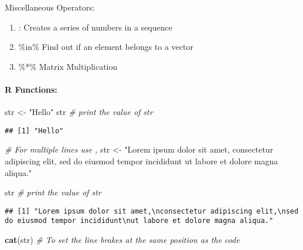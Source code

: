 \documentclass[
]{article}
\newenvironment{Shaded}{\begin{snugshade}}{\end{snugshade}}
\newcommand{\CommentTok}[1]{\textcolor[rgb]{0.56,0.35,0.01}{\textit{#1}}}
\newcommand{\FunctionTok}[1]{\textcolor[rgb]{0.13,0.29,0.53}{\textbf{#1}}}
\newcommand{\NormalTok}[1]{#1}
\newcommand{\OtherTok}[1]{\textcolor[rgb]{0.56,0.35,0.01}{#1}}
\newcommand{\StringTok}[1]{\textcolor[rgb]{0.31,0.60,0.02}{#1}}
\providecommand{\tightlist}{%
  \setlength{\itemsep}{0pt}\setlength{\parskip}{0pt}}
\begin{document}
Miscellaneous Operators:

\begin{enumerate}
\def\labelenumi{\arabic{enumi}.}
\tightlist
\item
  : Creates a series of numbers in a sequence\\
\item
  \%in\% Find out if an element belongs to a vector\\
\item
  \%*\% Matrix Multiplication
\end{enumerate}

\hypertarget{r-functions}{%
\paragraph{R Functions:}\label{r-functions}}

\begin{Shaded}
\begin{Highlighting}[]
\NormalTok{str }\OtherTok{\textless{}{-}} \StringTok{"Hello"}
\NormalTok{str }\CommentTok{\# print the value of str}
\end{Highlighting}
\end{Shaded}

\begin{verbatim}
## [1] "Hello"
\end{verbatim}

\begin{Shaded}
\begin{Highlighting}[]
\CommentTok{\# For multiple lines use ,}
\NormalTok{str }\OtherTok{\textless{}{-}} \StringTok{"Lorem ipsum dolor sit amet,}
\StringTok{consectetur adipiscing elit,}
\StringTok{sed do eiusmod tempor incididunt}
\StringTok{ut labore et dolore magna aliqua."}

\NormalTok{str }\CommentTok{\# print the value of str}
\end{Highlighting}
\end{Shaded}

\begin{verbatim}
## [1] "Lorem ipsum dolor sit amet,\nconsectetur adipiscing elit,\nsed do eiusmod tempor incididunt\nut labore et dolore magna aliqua."
\end{verbatim}

\begin{Shaded}
\begin{Highlighting}[]
\FunctionTok{cat}\NormalTok{(str) }\CommentTok{\# To set the line brakes at the same position as the code}
\end{Highlighting}
\end{Shaded}
\end{document}
